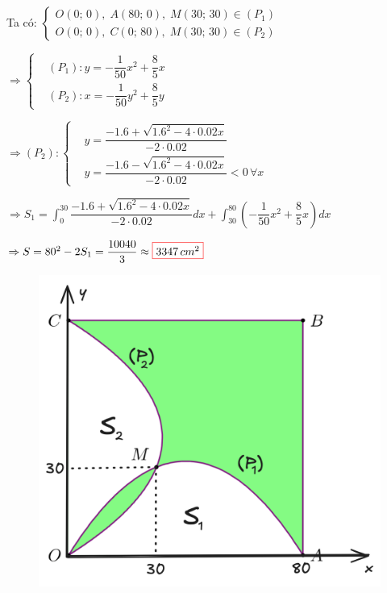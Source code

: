 \documentclass[twoside,final]{hcmut-report}
\newcommand{\result}[1]{\fcolorbox{red}{white}{#1}}
\begin{document}
\begin{minipage}{0.65\textwidth}
    Ta có: $
        \begin{cases}
            O(0;\,0),\; A(80;\,0),\; M(30;\,30) \in (P_1) \\
            O(0;\,0),\; C(0;\,80),\; M(30;\,30) \in (P_2)
        \end{cases}$\par
    $\Rightarrow
        \left\{\begin{aligned}
             & (P_1): y = -\dfrac{1}{50}x^2 + \dfrac{8}{5}x \\
             & (P_2): x = -\dfrac{1}{50}y^2 + \dfrac{8}{5}y
        \end{aligned}\right.$\par
    $\Rightarrow (P_2): \left\{\begin{aligned}
             & y = \dfrac{-1.6 + \sqrt{1.6^2 - 4\cdot 0.02x}}{-2\cdot 0.02}                 \\
             & y = \dfrac{-1.6 - \sqrt{1.6^2 - 4\cdot 0.02x}}{-2\cdot 0.02} < 0\, \forall x
        \end{aligned}\right.$\par
    $\Rightarrow S_1 = \displaystyle \int_{0}^{30}\dfrac{-1.6 + \sqrt{1.6^2 - 4\cdot 0.02x}}{-2\cdot 0.02} dx + \displaystyle \int_{30}^{80}(-\dfrac{1}{50}x^2 + \dfrac{8}{5}x)dx$\par
    $\Rightarrow S = 80^2 - 2S_1 = \dfrac{10040}{3} \approx \result{$3347\,cm^2$}$
\end{minipage}
\begin{minipage}{0.25\textwidth}
    \begin{figure}[H]
        \includegraphics[width=1.5\textwidth]{images/Ứng dụng tích phân/NBK-4-solve.png}
    \end{figure}
\end{minipage}
\end{document}
